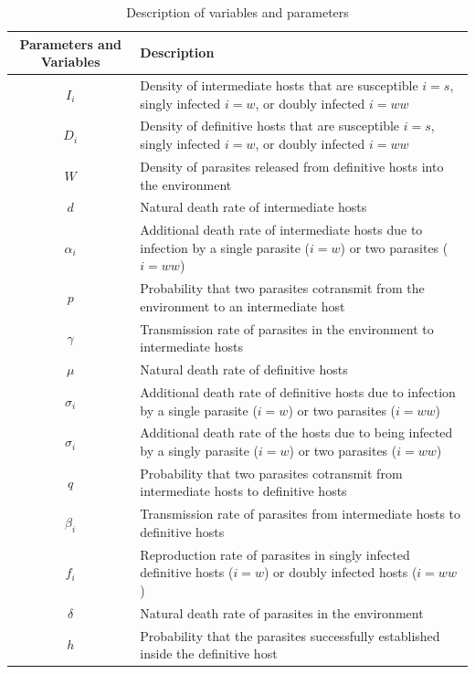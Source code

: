 \documentclass[a4paper]{scrartcl}
\begin{document}
\begin{table}[!ht]
\caption{Description of variables and parameters}
\label{table:varpardescription}
\centering
\begin{tabular}{c|p{10cm}}%
\hline
Parameters and Variables    &  Description  \\
\hline
$I_i$  & Density of intermediate hosts that are susceptible $i=s$, singly infected $i=w$, or doubly infected $i=ww$ \\
\hline
$D_i$ & Density of definitive hosts that are susceptible $i=s$, singly infected $i=w$, or doubly infected $i=ww$ \\
\hline
$W$ & Density of parasites released from definitive hosts into the environment \\
\hline
$d$ & Natural death rate of intermediate hosts \\
\hline
$\alpha_i$ & Additional death rate of intermediate hosts due to infection by a single parasite ($i = w$) or two parasites ($i = ww$) \\
\hline
$p$ & Probability that two parasites cotransmit from the environment to an intermediate host \\
\hline
$\gamma$ & Transmission rate of parasites in the environment to intermediate hosts \\
\hline
$\mu$ & Natural death rate of definitive hosts \\
\hline
$\sigma_i$ & Additional death rate of definitive hosts due to infection by a single parasite ($i = w$) or two parasites ($i = ww$) \\
\hline
$\sigma_i$ & Additional death rate of the hosts due to being infected by a singly parasite ($i = w$) or two parasites ($i = ww$) \\
\hline
$q$ & Probability that two parasites cotransmit from intermediate hosts to definitive hosts \\
\hline
$\beta_i$ & Transmission rate of parasites from intermediate hosts to definitive hosts \\
\hline
$f_i$ & Reproduction rate of parasites in singly infected definitive hosts ($i = w$) or doubly infected hosts ($i = ww$)\\
\hline
$\delta$ & Natural death rate of parasites in the environment \\
\hline 
$h$ & Probability that the parasites successfully established inside the definitive host 
\end{tabular}
\bigskip{}
\end{table}
\end{document}
